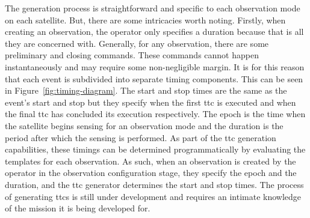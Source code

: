 The generation process is straightforward and specific to each observation mode
on each satellite. But, there are some intricacies worth noting. Firstly, when
creating an observation, the operator only specifies a duration because that is
all they are concerned with.  Generally, for any observation, there are some
preliminary and closing commands. These commands cannot happen instantaneously
and may require some non-negligible margin. It is for this reason that each
event is subdivided into separate timing components.  This can be seen in
Figure~\ref{fig:timing-diagram}. The start and stop times are the same as the event’s
start and stop but they specify when the first \gls{ttc} is executed and when
the final \gls{ttc} has concluded its execution respectively.  The epoch is the
time when the satellite begins sensing for an observation mode and the duration
is the period after which the sensing is performed. As part of the \gls{ttc}
generation capabilities, these timings can be determined programmatically by
evaluating the templates for each observation. As such, when an observation is
created by the operator in the observation configuration stage, they specify
the epoch and the duration, and the \gls{ttc} generator determines the start
and stop times. The process of generating \glspl{ttc} is still under
development and requires an intimate knowledge of the mission it is being
developed for. 




